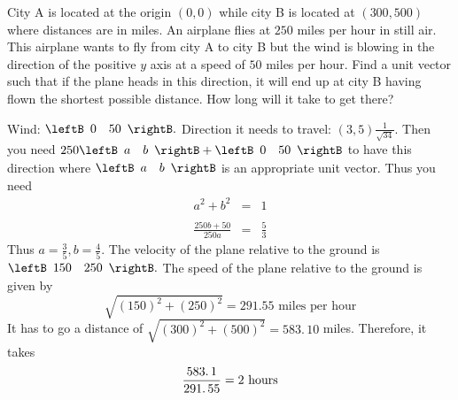 \begin{enumialphparenastyle}
\begin{ex} 
City A is located at the origin $\left( 0,0 \right)$ while city B is located at $\left(300,500 \right) $ where distances are in miles. An airplane flies at $250$
miles per hour in still air. This airplane wants to fly from city A to city
B but the wind is blowing in the direction of the positive $y$ axis at a
speed of $50$ miles per hour. Find a unit vector such that if the plane heads
in this direction, it will end up at city B having flown the shortest
possible distance. How long will it take to get there? \vspace{1mm}
\begin{sol}
Wind: $\leftB \begin{array}{cc}
0 & 50
\end{array}
\rightB .$ Direction it needs to travel: $\left( 3,5 \right) \frac{1}{\sqrt{34}}.$ Then you need $250 \leftB \begin{array}{cc}
 a & b
\end{array}
\rightB + \leftB \begin{array}{cc}
0 & 50
\end{array}
\rightB $ to
have this direction where $\leftB 
\begin{array}{cc}
 a & b
\end{array}
\rightB $ is an appropriate unit
vector. Thus you need
\begin{eqnarray*}
a^{2}+b^{2} &=&1 \\ 
& & \\
\frac{250b+50}{250a} &=&\frac{5}{3}
\end{eqnarray*}
Thus $a=\frac{3}{5},b=\frac{4}{5}.$ The velocity of the plane relative
to the ground is $\leftB
\begin{array}{cc}
150 & 250
\end{array}
\rightB .$ The speed of the plane relative to the ground is given by 
\[
\sqrt{\left( 150\right) ^{2}+\left( 250\right) ^{2}}=
291.55 \text{ miles per hour}
\]
It has to go a distance of $\sqrt{\left( 300\right) ^{2}+\left( 500\right)
^{2}}=\allowbreak 583.\,\allowbreak 10$ miles. Therefore, it takes
\[
\frac{\allowbreak 583.\,\allowbreak 1}{\allowbreak 291.\,\allowbreak 55}=2
\text{ hours}
\]
\end{sol}
\end{ex}


\end{enumialphparenastyle}
